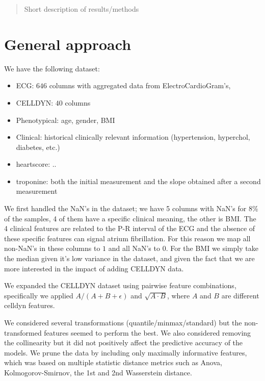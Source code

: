\documentclass[a4paper,10pt]{article}
\title{}
\author{Bram van Es}
\begin{document}
\maketitle

\begin{abstract}
Short description of results/methods
\end{abstract}

\section{General approach}
%
We have the following dataset:
\begin{itemize}
 \item ECG: $646$ columns with aggregated data from ElectroCardioGram's, 
 \item CELLDYN: $40$ columns
 \item Phenotypical: age, gender, BMI
 \item Clinical: historical clinically relevant information (hypertension, hyperchol, diabetes, etc.)
 \item heartscore: ..
 \item troponine: both the initial measurement and the slope obtained after a second measurement
\end{itemize}

We first handled the NaN's in the dataset; we have 5 columns with NaN's for 8\% of the samples, 4 of them have a specific clinical meaning, the other is BMI. The 4 clinical features are related to the P-R interval of the ECG 
and the absence of these specific features can signal atrium fibrillation. For this reason we map
all non-NaN's in these columns to $1$ and all NaN's to $0$. For the BMI we simply take the median given it's low variance in the dataset, and given the fact that we are more interested in the impact of adding CELLDYN data. 

We expanded the CELLDYN dataset using pairwise feature combinations, specifically we applied
$A/(A+B+\epsilon)$ and $\sqrt{A\cdot B}$, where $A$ and $B$ are different celldyn features.

We considered several transformations (quantile/minmax/standard) but the non-transformed features seemed to perform
the best. We also considered removing the collinearity but it did not positively affect the predictive accuracy
of the models. We prune the data by including only maximally informative features, which was based on multiple statistic distance metrics such as Anova, Kolmogorov-Smirnov, the 1st and 2nd Wasserstein distance.
%
\end{document}
